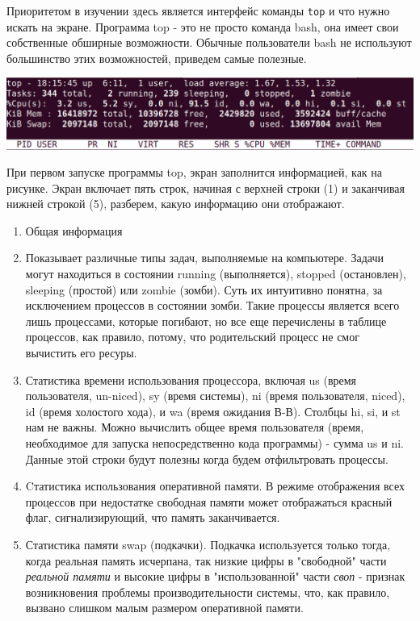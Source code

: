 \documentclass{report}
\begin{document}
Приоритетом в изучении здесь является интерфейс команды \texttt{top} и
что нужно искать на экране. Программа top - это не просто команда bash,
она имеет свои собственные обширные возможности. Обычные пользователи
bash не используют большинство этих возможностей, приведем самые
полезные.

\includegraphics{blog/2019/bash-essentials/top-header.png}

При первом запуске программы top, экран заполнится информацией, как на
рисунке. Экран включает пять строк, начиная с верхней строки (1) и
заканчивая нижней строкой (5), разберем, какую информацию они
отображают.

\begin{enumerate}
\tightlist
\item
  Общая информация
\item
  Показывает различные типы задач, выполняемые на компьютере. Задачи
  могут находиться в состоянии running (выполняется), stopped
  (остановлен), sleeping (простой) или zombie (зомби). Суть их
  интуитивно понятна, за исключением процессов в состоянии зомби. Такие
  процессы является всего лишь процессами, которые погибают, но все еще
  перечислены в таблице процессов, как правило, потому, что родительский
  процесс не смог вычистить его ресуры.
\item
  Статистика времени использования процессора, включая us (время
  пользователя, un-niced), sy (время системы), ni (время пользователя,
  niced), id (время холостого хода), и wa (время ожидания В-В). Столбцы
  hi, si, и st нам не важны. Можно вычислить общее время пользователя
  (время, необходимое для запуска непосредственно кода программы) -
  сумма us и ni. Данные этой строки будут полезны когда будем
  отфильтровать процессы.
\item
  Cтатистика использования оперативной памяти. В режиме отображения всех
  процессов при недостатке свободная памяти может отображаться красный
  флаг, сигнализирующий, что память заканчивается.
\item
  Статистика памяти swap (подкачки). Подкачка используется только тогда,
  когда реальная память исчерпана, так низкие цифры в "свободной" части
  \emph{реальной памяти} и высокие цифры в "использованной" части
  \emph{своп} - признак возникновения проблемы производительности
  системы, что, как правило, вызвано слишком малым размером оперативной
  памяти.
\end{enumerate}
\end{document}
